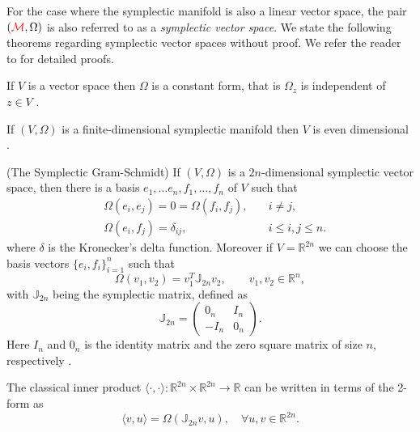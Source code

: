 For the case where the symplectic manifold is also a linear vector space, the pair $({\color{red} \mathcal M},\Omega)$ is also referred to as a \emph{symplectic vector space}. We state the following theorems regarding symplectic vector spaces without proof. We refer the reader to \cite{de2006symplectic,Marsden:1999ck,de2006symplectic,Silva01lectureson} for detailed proofs.

{\edit
\begin{theorem} \label{theorem:Hasy:1.1}
If $V$ is a vector space then $\Omega$ is a constant form, that is $\Omega_z$ is independent of $z\in V$ \cite{Marsden:1999ck}. 
\end{theorem}
\begin{theorem} \label{theorem:Hasy:1.2}
If $(V,\Omega)$ is a finite-dimensional symplectic manifold then $V$ is even dimensional \cite{Marsden:1999ck}.
\end{theorem}
\begin{theorem} \label{theorem:Hasy:1.3}
(The Symplectic Gram-Schmidt) If $(V,\Omega)$ is a $2n$-dimensional symplectic vector space, then there is a basis $e_1,\dots e_n,f_1, \dots , f_n$ of $V$ such that
\begin{equation} \label{eq:Hasy:4}
\begin{aligned}
	& \Omega(e_i,e_j) = 0 = \Omega(f_i,f_j), \quad & i\neq j,\\
	& \Omega(e_i,f_j) = \delta_{ij}, & i\leq i,j \leq n.
\end{aligned}
\end{equation}
where $\delta$ is the Kronecker's delta function. Moreover if $V = \mathbb{R}^{2n}$ we can choose the basis vectors $\{e_i,f_i\}_{i=1}^n$ such that
\begin{equation} \label{eq:Hasy:5}
	\Omega(v_1,v_2) = v_1^T \mathbb J_{2n} v_2, \qquad v_1,v_2\in \mathbb R^n,
\end{equation}
with $\mathbb J_{2n}$ being the symplectic matrix, defined as
\begin{equation} \label{eq:Hasy:6}
	\mathbb{J}_{2n} = 
	\begin{pmatrix}
		0_n & I_n \\
		-I_n & 0_n
	\end{pmatrix}.
\end{equation}
Here $I_n$ and $0_n$ is the identity matrix and the zero square matrix of size $n$, respectively \cite{de2006symplectic}.
\end{theorem}
\begin{theorem} \label{theorem:Hasy:1.4}
The classical inner product $\langle \cdot,\cdot \rangle:\mathbb R^{2n}\times \mathbb R^{2n}\to \mathbb R$ can be written in terms of the 2-form as \cite{Marsden:1999ck}
\begin{equation}
	\langle v,u \rangle = \Omega(\mathbb J_{2n}v,u),\quad \forall u,v \in \mathbb R^{2n}.
\end{equation}
\end{theorem}
}

